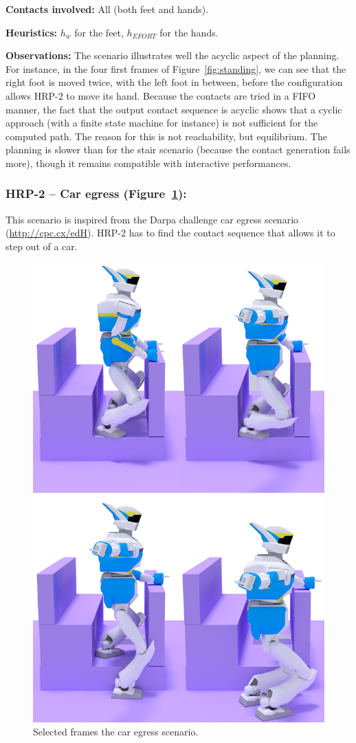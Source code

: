 \noindent\textbf{Contacts involved:} All (both feet and hands).

\noindent\textbf{Heuristics:} $h_w$ for the feet, $h_{EFORT}$  for the hands.

\noindent\textbf{Observations:} The scenario illustrates well the acyclic aspect of the planning. For instance, in the four first frames of Figure~\ref{fig:standing}, we can see that the right foot
is moved twice, with the left foot in between, before the configuration allows HRP-2 to move its hand.
Because the contacts are tried in a FIFO manner, the fact that the output contact sequence is acyclic shows that a cyclic approach (with a finite state machine for instance) is not sufficient
for the computed path. The reason for this is not reachability, but equilibrium. The planning is slower than for the stair scenario (because the contact generation fails more),
though it remains compatible with interactive performances. %


\subsubsection{HRP-2 -- Car egress (Figure~\ref{fig:car}):}
This scenario is inspired from the Darpa challenge car egress scenario (\url{http://cpc.cx/edH}). HRP-2 has 
to find the contact sequence that allows it to step out of a car.

\begin{figure}
  \centering
  \includegraphics[width=0.5\linewidth]{figures/car}
  \caption{
           Selected frames the car egress scenario. }
		   \label{fig:car}
\end{figure}


